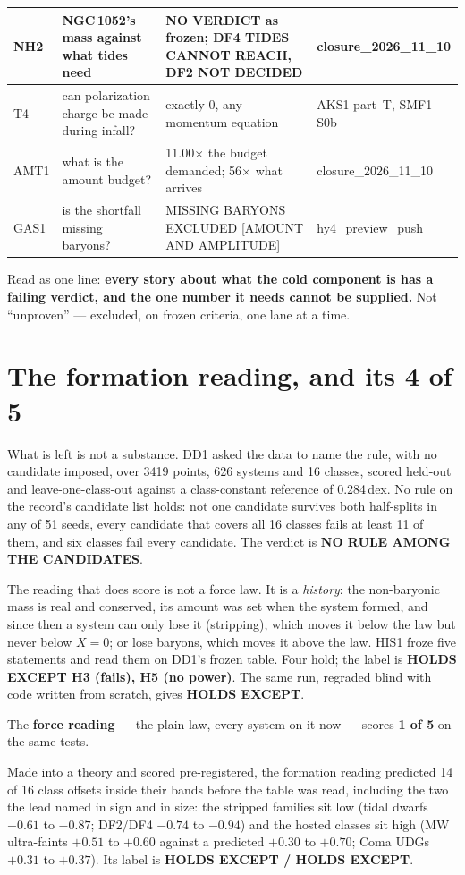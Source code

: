 \documentclass[10pt]{article}
\begin{document}
\begin{center}
\begin{longtable}{@{}p{1.3cm}p{5.0cm}p{5.4cm}p{2.4cm}@{}}
NH2 & NGC\,1052's mass against what tides need & NO VERDICT as frozen; DF4 TIDES CANNOT REACH, DF2 NOT DECIDED & closure\_2026\_11\_10\\\midrule
T4 & can polarization charge be made during infall? & exactly 0, any momentum equation & AKS1 part~T, SMF1 S0b\\\midrule
AMT1 & what is the amount budget? & 11.00$\times$ the budget demanded; 56$\times$ what arrives & closure\_2026\_11\_10\\\midrule
GAS1 & is the shortfall missing baryons? & MISSING BARYONS EXCLUDED [AMOUNT AND AMPLITUDE] & hy4\_preview\_push\\\bottomrule
\end{longtable}
\end{center}

Read as one line: {\bf every story about what the cold component is has a failing verdict, and the one number
it needs cannot be supplied.} Not ``unproven'' --- excluded, on frozen criteria, one lane at a time.

\section{The formation reading, and its 4 of 5}
What is left is not a substance. DD1 asked the data to name the rule, with no candidate imposed, over 3419 points,
626 systems and 16 classes, scored held-out and leave-one-class-out against a class-constant reference of 0.284\,dex.
No rule on the record's candidate list holds: not one candidate survives both half-splits in any of 51 seeds, every
candidate that covers all 16 classes fails at least 11 of them, and six classes fail every candidate. The verdict is
{\bf NO RULE AMONG THE CANDIDATES}.

The reading that does score is not a force law. It is a {\it history}: the non-baryonic mass is real and conserved, its
amount was set when the system formed, and since then a system can only lose it (stripping), which moves it below the law
but never below $X=0$; or lose baryons, which moves it above the law. HIS1 froze five statements and read them on DD1's
frozen table. Four hold; the label is {\bf HOLDS EXCEPT H3 (fails), H5 (no power)}. The same run, regraded blind with
code written from scratch, gives {\bf HOLDS EXCEPT}.

The {\bf force reading} --- the plain law, every system on it now --- scores {\bf 1 of 5} on the same tests.

Made into a theory and scored pre-registered, the formation reading predicted 14 of 16 class offsets inside their
bands before the table was read, including the two the lead named in sign and in size: the stripped families sit low
(tidal dwarfs $-0.61$ to $-0.87$; DF2/DF4 $-0.74$ to $-0.94$) and the hosted classes sit high (MW ultra-faints
$+0.51$ to $+0.60$ against a predicted $+0.30$ to $+0.70$; Coma UDGs $+0.31$ to $+0.37$). Its label is
{\bf HOLDS EXCEPT / HOLDS EXCEPT}.
\end{document}
